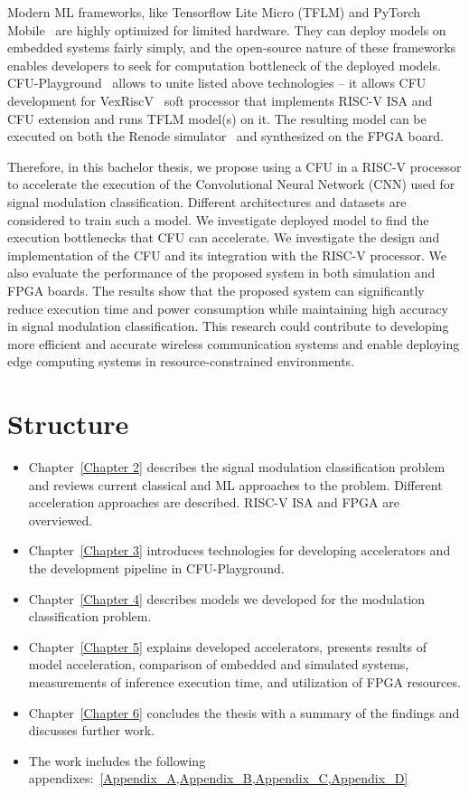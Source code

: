 Modern ML frameworks, like Tensorflow Lite Micro (TFLM) and PyTorch Mobile~\cite{tflm_and_pytorch_mobile} are highly optimized for limited hardware. They can deploy models on embedded systems fairly simply, and the open-source nature of these frameworks enables developers to seek for computation bottleneck of the deployed models. CFU-Playground~\cite{cfu_playground} allows to unite listed above technologies -- it allows CFU development for VexRiscV~\cite{vexriscv} soft processor that implements RISC-V ISA and CFU extension and runs TFLM model(s) on it. The resulting model can be executed on both the Renode simulator~\cite{renode} and synthesized on the FPGA board. 

Therefore, in this bachelor thesis, we propose using a CFU in a RISC-V processor to accelerate the execution of the Convolutional Neural Network (CNN) used for signal modulation classification. Different architectures and datasets are considered to train such a model. We investigate deployed model to find the execution bottlenecks that CFU can accelerate. We investigate the design and implementation of the CFU and its integration with the RISC-V processor. We also evaluate the performance of the proposed system in both simulation and FPGA boards. The results show that the proposed system can significantly reduce execution time and power consumption while maintaining high accuracy in signal modulation classification. This research could contribute to developing more efficient and accurate wireless communication systems and enable deploying edge computing systems in resource-constrained environments.

\section{Structure}
\begin{itemize}
    \item Chapter~\ref{Chapter 2} describes the signal modulation classification problem and reviews current classical and ML approaches to the problem. Different acceleration approaches are described. RISC-V ISA and FPGA are overviewed.
    \item Chapter~\ref{Chapter 3} introduces technologies for developing accelerators and the development pipeline in CFU-Playground.
    \item Chapter~\ref{Chapter 4} describes models we developed for the modulation classification problem.
    \item Chapter~\ref{Chapter 5} explains developed accelerators, presents results of model acceleration, comparison of embedded and simulated systems, measurements of inference execution time, and utilization of FPGA resources.
    \item Chapter~\ref{Chapter 6} concludes the thesis with a summary of the findings and discusses further work.
    \item The work includes the following appendixes:~\cref{Appendix_A,Appendix_B,Appendix_C,Appendix_D} 
\end{itemize}